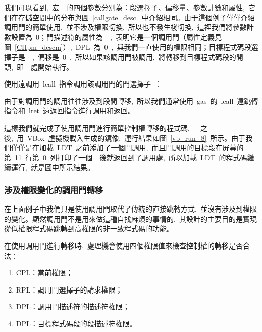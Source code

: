 我們可以看到,~宏~~的四個參數分別為：段選擇子、偏移量、參數計數和屬性,~它們在存儲空間中的分布與圖~\ref{callgate_desc}~中介紹相同。由于這個例子僅僅介紹調用門的簡單使用,~並不涉及權限切換,~所以也不發生棧切換,~這裡我們將參數計數設置為~0；門描述符的屬性為~~,~表明它是一個調用門（屬性定義見圖~\ref{CHpm_descm}）,~DPL~為~0~,~與我們一直使用的權限相同；目標程式碼段選擇子是~~,~偏移是~0~,~所以如果該調用門被調用,~將轉移到目標程式碼段的開頭,~即~~處開始執行。

使用遠調用~lcall~指令調用該調用門的門選擇子~：

\label{CHpm_cg_call1}

由于對調用門的調用往往涉及到段間轉移,~所以我們通常使用~gas~的~lcall~遠跳轉指令和~lret~遠返回指令進行調用和返回。

這樣我們就完成了使用調用門進行簡單控制權轉移的程式碼,~~~之後,~用~VBox~虛擬機載入生成的鏡像,~運行結果如圖~\ref{vb_run_8}~所示。由于我們僅僅是在加載~LDT~之前添加了一個門調用,~而且門調用的目標段在屏幕的第~11~行第~0~列打印了一個~~後就返回到了調用處,~所以加載~LDT~的程式碼繼續運行,~就是圖中所示結果。


\subsubsection{涉及權限變化的調用門轉移}

在上面例子中我們只是使用調用門取代了傳統的直接跳轉方式,~並沒有涉及到權限的變化。顯然調用門不是用來做這種自找麻煩的事情的,~其設計的主要目的是實現從低權限程式碼跳轉到高權限的非一致程式碼的功能。

在使用調用門進行轉移時,~處理機會使用四個權限值來檢查控制權的轉移是否合法：

\begin{enumerate}
\item CPL：當前權限；
\item RPL：調用門選擇子的請求權限；
\item DPL：調用門描述符的描述符權限；
\item DPL：目標程式碼段的段描述符權限。
\end{enumerate}

